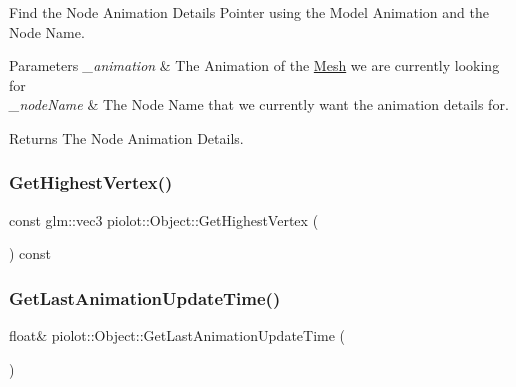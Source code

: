 Find the Node Animation Details Pointer using the Model Animation and the Node Name. 


\begin{DoxyParams}{Parameters}
{\em \+\_\+animation} & The Animation of the \mbox{\hyperlink{classpiolot_1_1_mesh}{Mesh}} we are currently looking for \\
\hline
{\em \+\_\+node\+Name} & The Node Name that we currently want the animation details for. \\
\hline
\end{DoxyParams}
\begin{DoxyReturn}{Returns}
The Node Animation Details. 
\end{DoxyReturn}
\mbox{\label{classpiolot_1_1_object_ac7704fb8d510eb5a4f02d7cbe6eced9f}} 
\subsubsection{\texorpdfstring{Get\+Highest\+Vertex()}{GetHighestVertex()}}
{\footnotesize\ttfamily const glm\+::vec3 piolot\+::\+Object\+::\+Get\+Highest\+Vertex (\begin{DoxyParamCaption}{ }\end{DoxyParamCaption}) const\hspace{0.3cm}{\ttfamily [inline]}}

\mbox{\label{classpiolot_1_1_object_ab948ad199b42e7182b6bc4b21cd68d9b}} 
\subsubsection{\texorpdfstring{Get\+Last\+Animation\+Update\+Time()}{GetLastAnimationUpdateTime()}}
{\footnotesize\ttfamily float\& piolot\+::\+Object\+::\+Get\+Last\+Animation\+Update\+Time (\begin{DoxyParamCaption}{ }\end{DoxyParamCaption})\hspace{0.3cm}{\ttfamily [inline]}}

